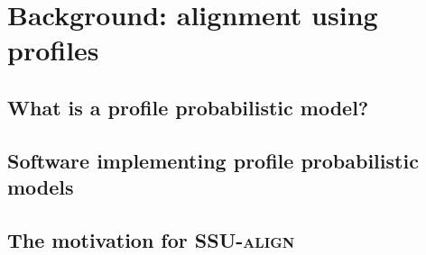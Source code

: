\section{Background: alignment using profiles}

\subsection{What is a profile probabilistic model?}

\begin{comment}
Profile probabilistic models are statistical models of a sequence
family that include \emph{position-specific} information about which
residues are 

For our purposes here it is 

Examples include profile hidden Markov models, commonly used
for protein sequence homology search and implemented in some widely
used software packages such as \software{HMMER} (CITE). 
\end{comment}

\subsection{Software implementing profile probabilistic models}

\subsection{The motivation for \textsc{SSU-align}}

